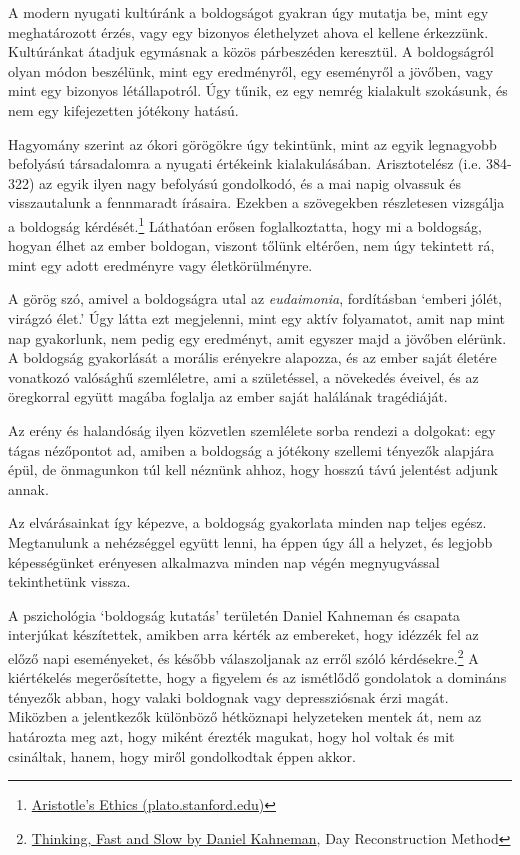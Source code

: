 
\noindent A modern nyugati kultúránk a boldogságot gyakran úgy mutatja
be, mint egy meghatározott érzés, vagy egy bizonyos élethelyzet ahova el
kellene érkezzünk. Kultúránkat átadjuk egymásnak a közös párbeszéden
keresztül. A boldogságról olyan módon beszélünk, mint egy eredményről,
egy eseményről a jövőben, vagy mint egy bizonyos létállapotról. Úgy
tűnik, ez egy nemrég kialakult szokásunk, és nem egy kifejezetten
jótékony hatású.

Hagyomány szerint az ókori görögökre úgy tekintünk, mint az egyik
legnagyobb befolyású társadalomra a nyugati értékeink kialakulásában.
Arisztotelész (i.e. 384-322) az egyik ilyen nagy befolyású gondolkodó,
és a mai napig olvassuk és visszautalunk a fennmaradt írásaira. Ezekben
a szövegekben részletesen vizsgálja a boldogság kérdését.\footnote{\href{https://plato.stanford.edu/entries/aristotle-ethics/}{Aristotle's
  Ethics (plato.stanford.edu)}} Láthatóan erősen foglalkoztatta, hogy mi
a boldogság, hogyan élhet az ember boldogan, viszont tőlünk eltérően,
nem úgy tekintett rá, mint egy adott eredményre vagy életkörülményre.

\enlargethispage*{\baselineskip}

A görög szó, amivel a boldogságra utal az \emph{eudaimonia}, fordításban
`emberi jólét, virágzó élet.' Úgy látta ezt megjelenni, mint egy aktív
folyamatot, amit nap mint nap gyakorlunk, nem pedig egy eredményt, amit
egyszer majd a jövőben elérünk. A boldogság gyakorlását a morális
erényekre alapozza, és az ember saját életére vonatkozó valósághű
szemléletre, ami a születéssel, a növekedés éveivel, és az öregkorral
együtt magába foglalja az ember saját halálának tragédiáját.

Az erény és halandóság ilyen közvetlen szemlélete sorba rendezi a
dolgokat: egy tágas nézőpontot ad, amiben a boldogság a jótékony
szellemi tényezők alapjára épül, de önmagunkon túl kell néznünk ahhoz,
hogy hosszú távú jelentést adjunk annak.

Az elvárásainkat így képezve, a boldogság gyakorlata minden nap teljes
egész. Megtanulunk a nehézséggel együtt lenni, ha éppen úgy áll a
helyzet, és legjobb képességünket erényesen alkalmazva minden nap végén
megnyugvással tekinthetünk vissza.

A pszichológia `boldogság kutatás' területén Daniel Kahneman és csapata
interjúkat készítettek, amikben arra kérték az embereket, hogy idézzék
fel az előző napi eseményeket, és később válaszoljanak az erről szóló
kérdésekre.\footnote{\href{https://www.goodreads.com/book/show/11468377-thinking-fast-and-slow}{Thinking,
  Fast and Slow by Daniel Kahneman}, Day Reconstruction Method} A
kiértékelés megerősítette, hogy a figyelem és az ismétlődő gondolatok a
domináns tényezők abban, hogy valaki boldognak vagy depressziósnak érzi
magát. Miközben a jelentkezők különböző hétköznapi helyzeteken mentek
át, nem az határozta meg azt, hogy miként érezték magukat, hogy hol
voltak és mit csináltak, hanem, hogy miről gondolkodtak éppen akkor.

